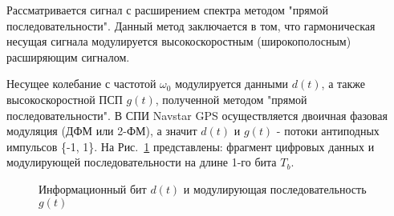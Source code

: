 %
%

Рассматривается сигнал с расширением спектра методом "прямой последовательности".
Данный метод заключается в том, что гармоническая несущая сигнала модулируется высокоскоростным (широкополосным)
расширяющим сигналом. 

Несущее колебание с частотой ${\omega_0}$  модулируется данными ${d(t)}$, а также высокоскоростной ПСП ${g(t)}$, полученной методом "прямой последовательности".
В СПИ Navstar GPS осуществляется двоичная фазовая модуляция (ДФМ или 2-ФМ), а значит ${d(t)}$  и ${g(t)}$  - потоки антиподных импульсов \{-1, 1\}.
На \mbox{Рис. \ref{pic:bit_and_code}} представлены: фрагмент цифровых данных и модулирующей последовательности на длине 1-го бита ${T_b}$.
\begin{figure}[h]
	\center{}
	\caption{Информационный бит ${d(t)}$ и модулирующая последовательность ${g(t)}$ } 
	\label{pic:bit_and_code}
\end{figure}

